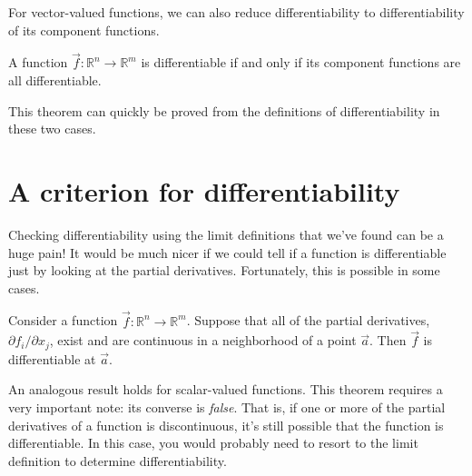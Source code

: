 \documentclass{ximera}
\begin{document}
For vector-valued functions, we can also reduce differentiability to differentiability of its component functions.

\begin{theorem}
A function $\vec{f}:\mathbb{R}^n\rightarrow\mathbb{R}^m$ is differentiable if and only if its component functions are all differentiable.
\end{theorem}

This theorem can quickly be proved from the definitions of differentiability in these two cases.

\section*{A criterion for differentiability}

Checking differentiability using the limit definitions that we've found can be a huge pain! It would be much nicer if we could tell if a function is differentiable just by looking at the partial derivatives. Fortunately, this is possible in some cases.

\begin{theorem}
Consider a function $\vec{f}:\mathbb{R}^n\rightarrow\mathbb{R}^m$. Suppose that all of the partial derivatives, $\partial f_i/\partial x_j$, exist and are continuous in a neighborhood of a point $\vec{a}$. Then $\vec{f}$ is differentiable at $\vec{a}$.
\end{theorem}

An analogous result holds for scalar-valued functions. This theorem requires a very important note: its converse is \emph{false}. That is, if one or more of the partial derivatives of a function is discontinuous, it's still possible that the function is differentiable. In this case, you would probably need to resort to the limit definition to determine differentiability.
\end{document}
